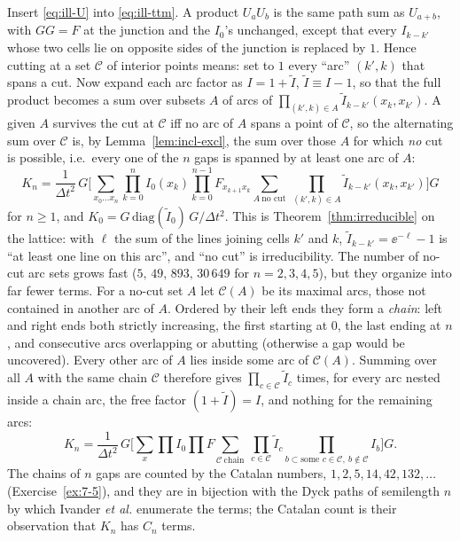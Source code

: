 Insert \cref{eq:ill-U} into \cref{eq:ill-ttm}.
A product $U_aU_b$ is the same path sum as $U_{a+b}$, with $GG=F$ at the junction and the $I_0$'s unchanged, except that every $I_{k-k'}$ whose two cells lie on opposite sides of the junction is replaced by $1$.
Hence cutting at a set $\mathcal C$ of interior points means: set to $1$ every ``arc'' $(k',k)$ that spans a cut.
Now expand each arc factor as $I=1+\tilde I$, $\tilde I\equiv I-1$, so that the full product becomes a sum over subsets $A$ of arcs of $\prod_{(k',k)\in A}\tilde I_{k-k'}(x_k,x_{k'})$.
A given $A$ survives the cut at $\mathcal C$ iff no arc of $A$ spans a point of $\mathcal C$, so the alternating sum over $\mathcal C$ is, by Lemma~\ref{lem:incl-excl}, the sum over those $A$ for which \emph{no} cut is possible, i.e.\ every one of the $n$ gaps is spanned by at least one arc of $A$:
\begin{equation}
  \boxed{\;K_n=\frac1{\Delta t^2}\,G\Big[\sum_{x_0\dots x_n}\prod_{k=0}^{n}I_0(x_k)\prod_{k=0}^{n-1}F_{x_{k+1}x_k}\!\!\sum_{A\ \text{no cut}}\ \prod_{(k',k)\in A}\tilde I_{k-k'}(x_k,x_{k'})\Big]G\;}
  \label{eq:ill-K}
\end{equation}
for $n\ge1$, and $K_0=G\,\mathrm{diag}(\tilde I_0)\,G/\Delta t^2$.
This is Theorem~\ref{thm:irreducible} on the lattice: with $\ell$ the sum of the lines joining cells $k'$ and $k$, $\tilde I_{k-k'}=\ee^{-\ell}-1$ is ``at least one line on this arc'', and ``no cut'' is irreducibility.
The number of no-cut arc sets grows fast ($5,\,49,\,893,\,30\,649$ for $n=2,3,4,5$), but they organize into far fewer terms.
For a no-cut set $A$ let $\mathcal C(A)$ be its maximal arcs, those not contained in another arc of $A$.
Ordered by their left ends they form a \emph{chain}: left and right ends both strictly increasing, the first starting at $0$, the last ending at $n$, and consecutive arcs overlapping or abutting (otherwise a gap would be uncovered).
Every other arc of $A$ lies inside some arc of $\mathcal C(A)$.
Summing over all $A$ with the same chain $\mathcal C$ therefore gives $\prod_{c\in\mathcal C}\tilde I_c$ times, for every arc nested inside a chain arc, the free factor $(1+\tilde I)=I$, and nothing for the remaining arcs:
\begin{equation}
  K_n=\frac1{\Delta t^2}\,G\Big[\sum_{x}\prod I_0\prod F\sum_{\mathcal C\ \text{chain}}\ \prod_{c\in\mathcal C}\tilde I_c\prod_{b\subset\text{some }c\in\mathcal C,\ b\notin\mathcal C}I_b\Big]G .
  \label{eq:ill-chain}
\end{equation}
The chains of $n$ gaps are counted by the Catalan numbers, $1,2,5,14,42,132,\dots$ (Exercise~\ref{ex:7-5}), and they are in bijection with the Dyck paths of semilength $n$ by which Ivander \emph{et al.} enumerate the terms; the Catalan count is their observation that $K_n$ has $C_n$ terms.

